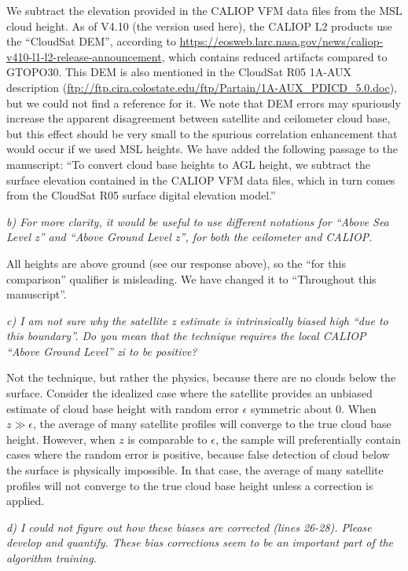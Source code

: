 \documentclass[12pt,a4paper]{responses}
\begin{document}
We subtract the elevation provided in the CALIOP VFM data files from the MSL
cloud height.  As of V4.10 (the version used here), the CALIOP L2 products use
the ``CloudSat DEM'', according to
\url{https://eosweb.larc.nasa.gov/news/caliop-v410-l1-l2-release-announcement},
which contains reduced artifacts compared to GTOPO30.  This DEM is also
mentioned in the CloudSat R05 1A-AUX description
(\url{ftp://ftp.cira.colostate.edu/ftp/Partain/1A-AUX_PDICD_5.0.doc}), but we
could not find a reference for it.  We note that DEM errors may spuriously
increase the apparent disagreement between satellite and ceilometer cloud base,
but this effect should be very small to the spurious correlation enhancement
that would occur if we used MSL heights.  We have added the following passage to
the manuscript: ``To convert cloud base heights to AGL height, we subtract the
surface elevation contained in the CALIOP VFM data files, which in turn comes
from the CloudSat R05 surface digital elevation model.''

\textit{b) For more clarity,  it would be
useful  to  use  different  notations  for  “Above  Sea  Level  z”  and  “Above  Ground  Level
z”, for both the ceilometer and CALIOP.} 

All heights are above ground (see our response above), so the ``for this
comparison'' qualifier is misleading.  We have changed it to ``Throughout this
manuscript''. 

\textit{c) I am not sure why the satellite z estimate
is intrinsically biased high “due to this boundary”.   Do you mean that the technique
requires the local CALIOP “Above Ground Level” zi to be positive?} 

Not the technique, but rather the physics, because there are no
clouds below the surface.  Consider the idealized case where the
satellite provides an unbiased estimate of cloud base height with random error
$\epsilon$ symmetric about 0.  When $z\gg\epsilon$, the average of many satellite profiles will
converge to the true cloud base height.  However, when $z$ is comparable to
$\epsilon$, the sample will preferentially contain cases where the random error
is positive, because false detection of cloud below the surface is physically
impossible.  In that case, the average of many satellite profiles will not
converge to the true cloud base height unless a correction is applied.

\textit{d) I could not figure
out how these biases are corrected (lines 26-28). Please develop and quantify. These
bias corrections seem to be an important part of the algorithm training.}
\end{document}
